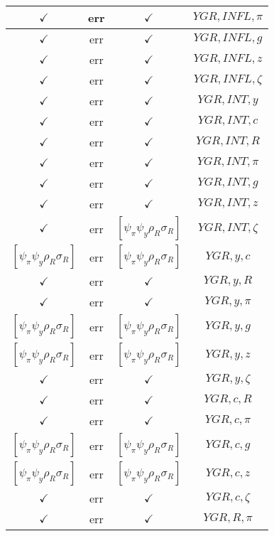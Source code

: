 \documentclass[a4paper,10pt]{article}
\begin{document}
\begin{longtable}{|c|c|c|c|}
\hline
$\checkmark$ & err & $\checkmark$ & ${YGR},{INFL},{\pi}$ \\
\hline
$\checkmark$ & err & $\checkmark$ & ${YGR},{INFL},{g}$ \\
\hline
$\checkmark$ & err & $\checkmark$ & ${YGR},{INFL},{z}$ \\
\hline
$\checkmark$ & err & $\checkmark$ & ${YGR},{INFL},{\zeta}$ \\
\hline
$\checkmark$ & err & $\checkmark$ & ${YGR},{INT},{y}$ \\
\hline
$\checkmark$ & err & $\checkmark$ & ${YGR},{INT},{c}$ \\
\hline
$\checkmark$ & err & $\checkmark$ & ${YGR},{INT},{R}$ \\
\hline
$\checkmark$ & err & $\checkmark$ & ${YGR},{INT},{\pi}$ \\
\hline
$\checkmark$ & err & $\checkmark$ & ${YGR},{INT},{g}$ \\
\hline
$\checkmark$ & err & $\checkmark$ & ${YGR},{INT},{z}$ \\
\hline
$\checkmark$ & err & $[\psi_\pi \psi_y \rho_R \sigma_R ]$ & ${YGR},{INT},{\zeta}$ \\
\hline
$[\psi_\pi \psi_y \rho_R \sigma_R ]$ & err & $[\psi_\pi \psi_y \rho_R \sigma_R ]$ & ${YGR},{y},{c}$ \\
\hline
$\checkmark$ & err & $\checkmark$ & ${YGR},{y},{R}$ \\
\hline
$\checkmark$ & err & $\checkmark$ & ${YGR},{y},{\pi}$ \\
\hline
$[\psi_\pi \psi_y \rho_R \sigma_R ]$ & err & $[\psi_\pi \psi_y \rho_R \sigma_R ]$ & ${YGR},{y},{g}$ \\
\hline
$[\psi_\pi \psi_y \rho_R \sigma_R ]$ & err & $[\psi_\pi \psi_y \rho_R \sigma_R ]$ & ${YGR},{y},{z}$ \\
\hline
$\checkmark$ & err & $\checkmark$ & ${YGR},{y},{\zeta}$ \\
\hline
$\checkmark$ & err & $\checkmark$ & ${YGR},{c},{R}$ \\
\hline
$\checkmark$ & err & $\checkmark$ & ${YGR},{c},{\pi}$ \\
\hline
$[\psi_\pi \psi_y \rho_R \sigma_R ]$ & err & $[\psi_\pi \psi_y \rho_R \sigma_R ]$ & ${YGR},{c},{g}$ \\
\hline
$[\psi_\pi \psi_y \rho_R \sigma_R ]$ & err & $[\psi_\pi \psi_y \rho_R \sigma_R ]$ & ${YGR},{c},{z}$ \\
\hline
$\checkmark$ & err & $\checkmark$ & ${YGR},{c},{\zeta}$ \\
\hline
$\checkmark$ & err & $\checkmark$ & ${YGR},{R},{\pi}$ \\

\end{longtable}
\end{document}
